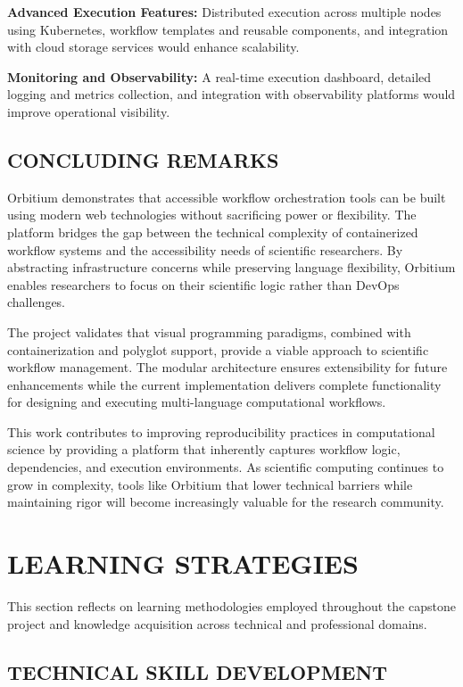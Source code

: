 \documentclass[12pt]{article}
\begin{document}
\textbf{Advanced Execution Features:} Distributed execution across multiple nodes using Kubernetes, workflow templates and reusable components, and integration with cloud storage services would enhance scalability.

\textbf{Monitoring and Observability:} A real-time execution dashboard, detailed logging and metrics collection, and integration with observability platforms would improve operational visibility.

\subsection{CONCLUDING REMARKS}

Orbitium demonstrates that accessible workflow orchestration tools can be built using modern web technologies without sacrificing power or flexibility. The platform bridges the gap between the technical complexity of containerized workflow systems and the accessibility needs of scientific researchers. By abstracting infrastructure concerns while preserving language flexibility, Orbitium enables researchers to focus on their scientific logic rather than DevOps challenges.

The project validates that visual programming paradigms, combined with containerization and polyglot support, provide a viable approach to scientific workflow management. The modular architecture ensures extensibility for future enhancements while the current implementation delivers complete functionality for designing and executing multi-language computational workflows.

This work contributes to improving reproducibility practices in computational science by providing a platform that inherently captures workflow logic, dependencies, and execution environments. As scientific computing continues to grow in complexity, tools like Orbitium that lower technical barriers while maintaining rigor will become increasingly valuable for the research community.

\newpage
\section{LEARNING STRATEGIES}

This section reflects on learning methodologies employed throughout the capstone project and knowledge acquisition across technical and professional domains.

\subsection{TECHNICAL SKILL DEVELOPMENT}
\end{document}
